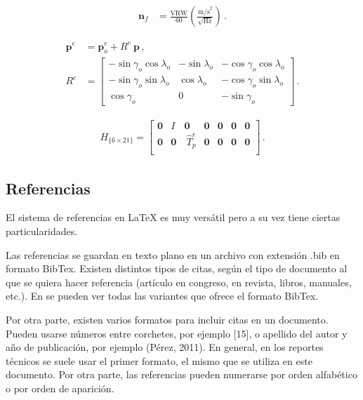 \documentclass{article}
\begin{document}
\begin{align} \label{eq:vrw}
	{\boldsymbol n}_f &= \frac{ \text{VRW} }{60} \left ( \frac{\text{m/s}^2}{\sqrt{\text{Hz}}} \right ) \, .
\end{align}

\begin{subequations}  \label{ned2ecef}
	\begin{align}
		\label{eq:pe}{\boldsymbol p}^e &= {\boldsymbol p}^e_{o} + R^e ~ {\boldsymbol p}  \, , \\
		R^e &=
		\begin{bmatrix}
			-\sin {\gamma_o} \cos {\lambda_o} & -\sin \lambda_o & -\cos \gamma_o \cos \lambda_o \\
			-\sin {\gamma_o} \sin {\lambda_o} &  \cos \lambda_o & -\cos \gamma_o \sin \lambda_o \\
			 \cos {\gamma_o}		  & 0	            & -\sin \gamma_o
		\end{bmatrix} \, .
	\end{align}
\end{subequations}

\begin{align}
\label{eq:h-matrix} H_{\{6\times21\}} =
\begin{bmatrix}
        \boldsymbol{0} & I  & \boldsymbol{0} &\boldsymbol{0}& \boldsymbol{0} &\boldsymbol{0}& \boldsymbol{0} \\
        \boldsymbol{0} & \boldsymbol{0} & ~\hat T_p^r  &\boldsymbol{0}& \boldsymbol{0} &\boldsymbol{0}& \boldsymbol{0}\\
  \end{bmatrix} \, .
\end{align}

\subsection{Referencias} \label{sec:referencias}

El sistema de referencias en \LaTeX{} es muy versátil pero a su vez tiene ciertas particularidades.

Las referencias se guardan en texto plano en un archivo con extensión .bib en formato BibTex. Existen distintos tipos de citas, según el tipo de documento al que se quiera hacer referencia (artículo en congreso, en revista, libros, manuales, etc.). En \cite{BibtexExamples2019} se pueden ver todas las variantes que ofrece el formato BibTex.

Por otra parte, existen varios formatos para incluir citas en un documento. Pueden usarse números entre corchetes, por ejemplo [15], o apellido del autor y año de publicación, por ejemplo (Pérez, 2011). En general, en los reportes técnicos se suele usar el primer formato, el mismo que se utiliza en este documento. Por otra parte, las referencias pueden numerarse por orden alfabético o por orden de aparición.
\end{document}
